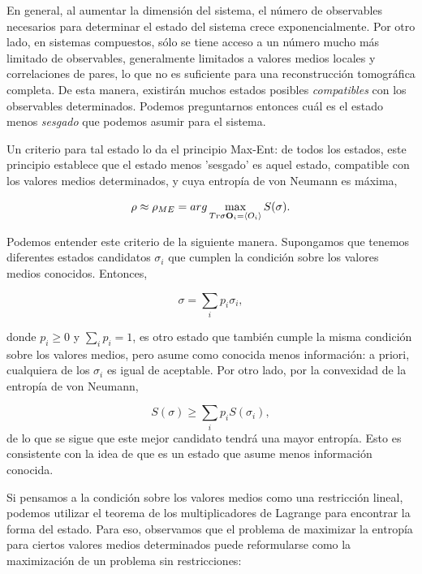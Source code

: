 \documentclass{report} %
\numberwithin{equation}{section}
\begin{document}
En general, al aumentar la dimensión del sistema, el número de observables necesarios para determinar el estado del sistema crece exponencialmente.
Por otro lado, en sistemas compuestos, s\'olo se tiene acceso a un n\'umero mucho m\'as limitado de observables, 
generalmente limitados a valores medios locales y correlaciones de pares, lo que no es suficiente para una reconstrucción tomográfica completa.
De esta manera, existirán muchos estados posibles \emph{compatibles} con los observables determinados. Podemos preguntarnos entonces cuál es el estado menos \emph{sesgado} que podemos asumir para el sistema. 

Un criterio para tal estado lo da el principio Max-Ent: de todos los estados, este principio establece que el estado menos 'sesgado' es aquel  estado,  compatible con los valores medios determinados, y cuya entropía de von Neumann es máxima,

\begin{equation*}
\rho\approx \rho_{ME} = {arg}\max_{{ Tr}\sigma {\bf O}_i =\langle  O_i\rangle} S(\sigma).
\end{equation*}

Podemos entender este criterio de la siguiente manera. Supongamos que tenemos diferentes estados candidatos $\sigma_i$ que cumplen la condición sobre los valores medios conocidos. Entonces,

\begin{equation*}
\sigma =\sum_i p_i \sigma_i,
\end{equation*}

donde $p_i\geq 0$ y $\sum_i p_i=1$, es otro estado que también cumple la misma condición sobre los valores medios, pero asume como conocida menos información: a priori, cualquiera de los $\sigma_i$ es igual de aceptable. Por otro lado, por la convexidad de la entropía de von Neumann,

\begin{equation*}
S(\sigma)\geq \sum_i p_i S(\sigma_i),
\end{equation*}
de lo que se sigue que este mejor candidato tendrá una mayor entropía. Esto es consistente con la idea de que es un estado que asume menos información conocida. 

Si pensamos a la condición sobre los valores medios como una restricción lineal, podemos utilizar el teorema de los multiplicadores de Lagrange para encontrar la forma del estado. Para eso, observamos que el problema de maximizar la entropía para ciertos valores medios determinados puede reformularse como la maximización de un problema sin restricciones:
\end{document}

